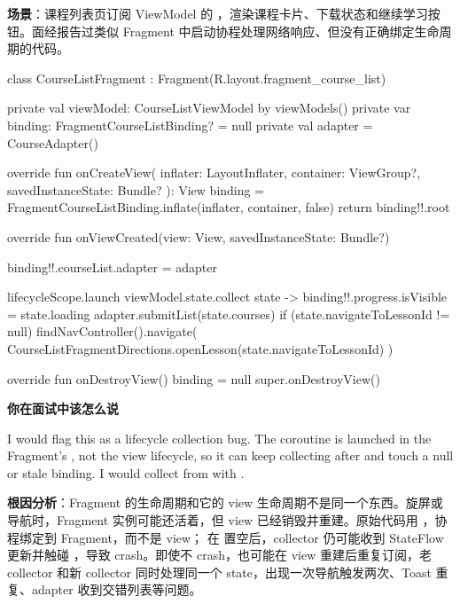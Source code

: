 \textbf{场景}：课程列表页订阅 ViewModel 的 ，渲染课程卡片、下载状态和继续学习按钮。\srccommunity 面经报告过类似 Fragment 中启动协程处理网络响应、但没有正确绑定生命周期的代码。

\begin{ktbug}
class CourseListFragment : Fragment(R.layout.fragment_course_list) {

    private val viewModel: CourseListViewModel by viewModels()
    private var binding: FragmentCourseListBinding? = null
    private val adapter = CourseAdapter()

    override fun onCreateView(
        inflater: LayoutInflater,
        container: ViewGroup?,
        savedInstanceState: Bundle?
    ): View {
        binding = FragmentCourseListBinding.inflate(inflater, container, false)
        return binding!!.root
    }

    override fun onViewCreated(view: View, savedInstanceState: Bundle?) {
        binding!!.courseList.adapter = adapter

        lifecycleScope.launch {
            viewModel.state.collect { state ->
                binding!!.progress.isVisible = state.loading
                adapter.submitList(state.courses)
                if (state.navigateToLessonId != null) {
                    findNavController().navigate(
                        CourseListFragmentDirections.openLesson(state.navigateToLessonId)
                    )
                }
            }
        }
    }

    override fun onDestroyView() {
        binding = null
        super.onDestroyView()
    }
}
\end{ktbug}

\textbf{你在面试中该怎么说}
\begin{sayit}[生命周期绑定]
I would flag this as a lifecycle collection bug. The coroutine is launched in the Fragment's , not the view lifecycle, so it can keep collecting after  and touch a null or stale binding. I would collect from  with .
\end{sayit}

\textbf{根因分析}：Fragment 的生命周期和它的 view 生命周期不是同一个东西。旋屏或导航时，Fragment 实例可能还活着，但 view 已经销毁并重建。原始代码用 ，协程绑定到 Fragment，而不是 view； 在  置空后，collector 仍可能收到 StateFlow 更新并触碰 ，导致 crash。即使不 crash，也可能在 view 重建后重复订阅，老 collector 和新 collector 同时处理同一个 state，出现一次导航触发两次、Toast 重复、adapter 收到交错列表等问题。 \srcinferred


